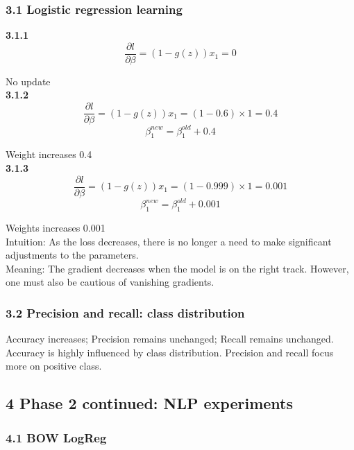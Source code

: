 \documentclass[11pt]{article}
\begin{document}
\subsubsection*{3.1 Logistic regression learning}

\noindent \textbf{3.1.1}
\[\frac{\partial l}{\partial \beta} = (1 - g(z))x_1 = 0\]

\noindent No update
\\

\noindent \textbf{3.1.2}
\[\frac{\partial l}{\partial \beta} = (1 - g(z))x_1 = (1-0.6)\times 1 = 0.4\]
\[\beta_1^{new} = \beta_1^{old} + 0.4\]

\noindent Weight increases 0.4\\

\noindent \textbf{3.1.3}
\[\frac{\partial l}{\partial \beta} = (1 - g(z))x_1 = (1-0.999)\times 1 = 0.001\]
\[\beta_1^{new} = \beta_1^{old} + 0.001\]

\noindent Weights increases 0.001\\

\noindent Intuition:
As the loss decreases, there is no longer a need to make significant adjustments to the parameters.\\

\noindent Meaning:
The gradient decreases when the model is on the right track. However, one must also be cautious of vanishing gradients.

\subsubsection*{3.2 Precision and recall: class distribution}

\noindent Accuracy increases; Precision remains unchanged; Recall remains unchanged.\\

\noindent Accuracy is highly influenced by class distribution.
Precision and recall focus more on positive class.

\subsection*{4 Phase 2 continued: NLP experiments}

\subsubsection*{4.1 BOW LogReg}
\end{document}
